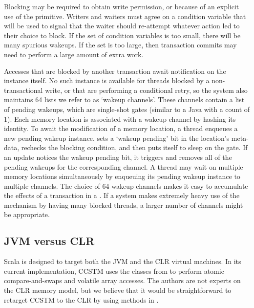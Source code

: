 Blocking may be required to obtain write permission, or because of an
explicit use of the  primitive.  Writers and waiters must
agree on a condition variable that will be used to signal that the
waiter should re-attempt whatever action led to their choice to block.
If the set of condition variables is too small, there will be many
spurious wakeups.  If the set is too large, then transaction commits may need to
perform a large amount of extra work.

Accesses that are blocked by another transaction await notification
on the  instance itself.  No such instance is available for
threads blocked by a non-transactional write, or that are performing a
conditional retry, so the system also maintains 64 lists we refer to as
`wakeup channels'.  These channels contain a list of pending wakeups,
which are single-shot gates (similar to a Java 
with a count of 1).  Each memory location is associated with a wakeup
channel by hashing its identity.  To await the modification of a
memory location, a thread enqueues a new pending wakeup instance,
sets a `wakeup pending' bit in the location's meta-data, rechecks the
blocking condition, and then puts itself to sleep on the gate.  If an
update notices the wakeup pending bit, it triggers and removes all of
the pending wakeups for the corresponding channel.  A thread may wait on
multiple memory locations simultaneously by enqueuing its pending wakeup
instance to multiple channels.  The choice of 64 wakeup channels makes
it easy to accumulate the effects of a transaction in a .
If a system makes extremely heavy use of the  mechanism by
having many blocked threads, a larger number of channels might be appropriate.

\subsection{JVM versus CLR}

Scala is designed to target both the JVM and the CLR virtual machines.  In
its current implementation, CCSTM uses the  classes
from  to perform atomic compare-and-swaps and
volatile array accesses.  The authors are not experts on the CLR memory
model, but we believe that it would be straightforward to retarget CCSTM
to the CLR by using methods in .

